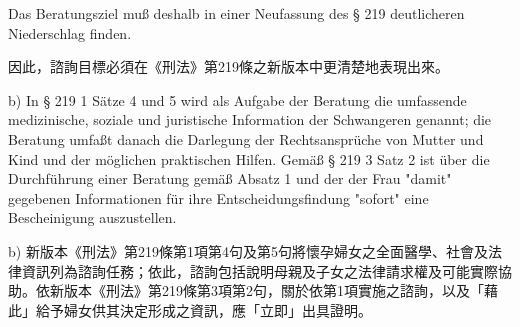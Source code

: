 \documentclass[12pt]{article}
\begin{document}
\begin{sourcepara}[title={原文E.180}]
Das Beratungsziel muß deshalb in einer Neufassung des § 219 \abbrStGB{} deutlicheren Niederschlag finden.
\end{sourcepara}
\begin{transpara}
因此，諮詢目標必須在《刑法》第219條之新版本中更清楚地表現出來。
\end{transpara}

\begin{sourcepara}[title={原文E.181}]
b) In § 219 \abbrAbs{} 1 Sätze 4 und 5 \abbrStGB{} \abbrNF{} wird als Aufgabe der Beratung die umfassende medizinische, soziale und juristische Information der Schwangeren genannt; die Beratung umfaßt danach die Darlegung der Rechtsansprüche von Mutter und Kind und der möglichen praktischen Hilfen. Gemäß § 219 \abbrAbs{} 3 Satz 2 \abbrStGB{} \abbrNF{} ist über die Durchführung einer Beratung gemäß Absatz 1 und der der Frau "damit" gegebenen Informationen für ihre Entscheidungsfindung "sofort" eine Bescheinigung auszustellen.
\end{sourcepara}
\begin{transpara}
b) 新版本《刑法》第219條第1項第4句及第5句將懷孕婦女之全面醫學、社會及法律資訊列為諮詢任務；依此，諮詢包括說明母親及子女之法律請求權及可能實際協助。依新版本《刑法》第219條第3項第2句，關於依第1項實施之諮詢，以及「藉此」給予婦女供其決定形成之資訊，應「立即」出具證明。
\end{transpara}
\end{document}

